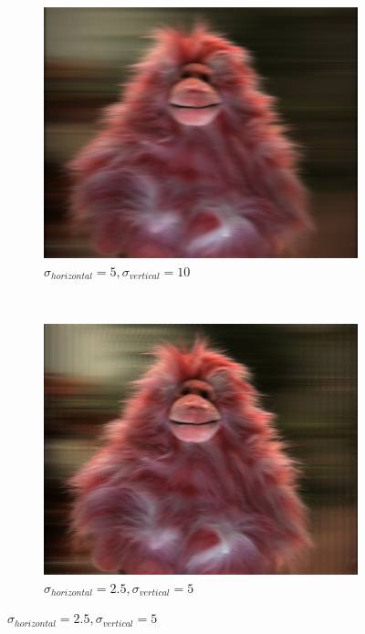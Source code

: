 \documentclass[a4paper]{article}
\begin{document}
\begin{figure}[ht]
	\begin{subfigure}[h]{0.48\textwidth}
	  \includegraphics[width=\textwidth]{shearedGauss_k1_shear16_sighor5_sigvert10}
	  \caption*{$\sigma_{horizontal} = 5, \sigma_{vertical} = 10$}
	\end{subfigure}
    	~
	\begin{subfigure}[h]{0.48\textwidth}
	  \includegraphics[width=\textwidth]{shearedGauss_k1_shear16_sighor2-5_sigvert5}
	  \caption*{$\sigma_{horizontal} = 2.5, \sigma_{vertical} = 5$}
	\end{subfigure}
	

\end{figure}
\end{document}
